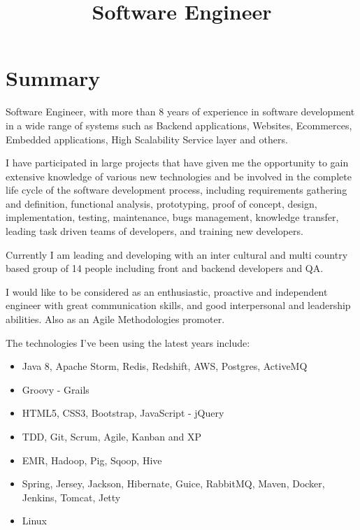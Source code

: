 \documentclass[11pt,a4paper,sans]{moderncv}        %
\title{Software Engineer}                               %
\begin{document}
\makecvtitle

\section{Summary}
Software Engineer, with more than 8 years of experience in software development in a wide range of systems 
such as Backend applications, Websites, Ecommerces, Embedded applications, High Scalability Service layer and
others.

\medskip I have participated in large projects that have given me the opportunity to gain extensive knowledge of various new
technologies and be involved in the complete life cycle of the software development process, including requirements
gathering and definition, functional analysis, prototyping, proof of concept, design, implementation, testing,
maintenance, bugs management, knowledge transfer, leading task driven teams of developers, and training new
developers.

\medskip Currently I am leading and developing with an inter cultural and multi country based group of 14 people including front and backend developers and QA.

\medskip I would like to be considered as an enthusiastic, proactive and independent engineer with great communication skills,
and good interpersonal and leadership abilities. Also as an Agile Methodologies promoter.

\medskip The technologies I've been using the latest years include:
\begin{itemize}
  \item Java 8, Apache Storm, Redis, Redshift, AWS, Postgres, ActiveMQ
  \item Groovy - Grails
  \item HTML5, CSS3, Bootstrap, JavaScript - jQuery
  \item TDD, Git, Scrum, Agile, Kanban and XP
  \item EMR, Hadoop, Pig, Sqoop, Hive
  \item Spring, Jersey, Jackson, Hibernate, Guice, RabbitMQ, Maven, Docker, Jenkins, Tomcat, Jetty
  \item Linux
\end{itemize}
\clearpage
\end{document}
